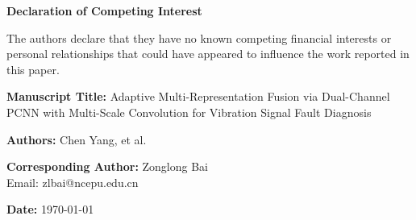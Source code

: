 \documentclass[12pt,a4paper]{article}
\begin{document}
	
	\begin{center}
		\Large\textbf{Declaration of Competing Interest}
	\end{center}
	\vspace{1cm}
	
	The authors declare that they have no known competing financial interests or personal relationships 
	that could have appeared to influence the work reported in this paper.
	
	\vspace{2cm}
	
	\noindent
	\textbf{Manuscript Title:} Adaptive Multi-Representation Fusion via Dual-Channel PCNN with Multi-Scale Convolution for Vibration Signal Fault Diagnosis
	
	\vspace{0.8cm}
	\noindent
	\textbf{Authors:} Chen Yang, et al.
	
	\vspace{0.8cm}
	\noindent
	\textbf{Corresponding Author:} Zonglong Bai \\
	Email: zlbai@ncepu.edu.cn
	
	\vfill
	\noindent
	\textbf{Date:} \today
	
\end{document}

